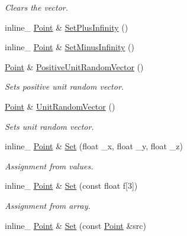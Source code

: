 \begin{DoxyCompactItemize}
\begin{DoxyCompactList}\small\item\em Clears the vector. \end{DoxyCompactList}\item 
inline\+\_\+ \hyperlink{classPoint}{Point} \& \hyperlink{classPoint_ae5caa664712b58534de82365bade6bd6}{Set\+Plus\+Infinity} ()
\item 
inline\+\_\+ \hyperlink{classPoint}{Point} \& \hyperlink{classPoint_a9c151b5a1319468021765fbc2fe394b4}{Set\+Minus\+Infinity} ()
\item 
\hyperlink{classPoint}{Point} \& \hyperlink{classPoint_a7e97184786b36c6c8d0aafd6b6fc9948}{Positive\+Unit\+Random\+Vector} ()\hypertarget{classPoint_a7e97184786b36c6c8d0aafd6b6fc9948}{}\label{classPoint_a7e97184786b36c6c8d0aafd6b6fc9948}

\begin{DoxyCompactList}\small\item\em Sets positive unit random vector. \end{DoxyCompactList}\item 
\hyperlink{classPoint}{Point} \& \hyperlink{classPoint_a3b6531fba934cafe46f5a44eb0bb5ba3}{Unit\+Random\+Vector} ()\hypertarget{classPoint_a3b6531fba934cafe46f5a44eb0bb5ba3}{}\label{classPoint_a3b6531fba934cafe46f5a44eb0bb5ba3}

\begin{DoxyCompactList}\small\item\em Sets unit random vector. \end{DoxyCompactList}\item 
inline\+\_\+ \hyperlink{classPoint}{Point} \& \hyperlink{classPoint_ae6742f4c914004b7531d52e9c74d8fd1}{Set} (float \+\_\+x, float \+\_\+y, float \+\_\+z)\hypertarget{classPoint_ae6742f4c914004b7531d52e9c74d8fd1}{}\label{classPoint_ae6742f4c914004b7531d52e9c74d8fd1}

\begin{DoxyCompactList}\small\item\em Assignment from values. \end{DoxyCompactList}\item 
inline\+\_\+ \hyperlink{classPoint}{Point} \& \hyperlink{classPoint_a6c44540a081410570dbf657fae2e22b2}{Set} (const float f\mbox{[}3\mbox{]})\hypertarget{classPoint_a6c44540a081410570dbf657fae2e22b2}{}\label{classPoint_a6c44540a081410570dbf657fae2e22b2}

\begin{DoxyCompactList}\small\item\em Assignment from array. \end{DoxyCompactList}\item 
inline\+\_\+ \hyperlink{classPoint}{Point} \& \hyperlink{classPoint_ab4797efd8edaaee5f0dbea5adea17979}{Set} (const \hyperlink{classPoint}{Point} \&src)\hypertarget{classPoint_ab4797efd8edaaee5f0dbea5adea17979}{}\label{classPoint_ab4797efd8edaaee5f0dbea5adea17979}


\end{DoxyCompactItemize}
